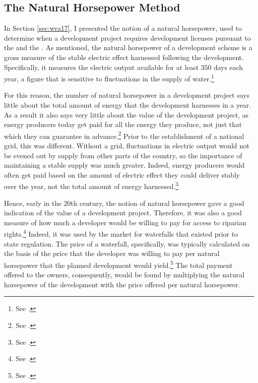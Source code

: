 \subsection{The Natural Horsepower Method}\label{sec:nathp}

In Section \ref{sec:wra17}, I presented the notion of a natural horsepower, used to determine when a development project requires development licenses pursuant to the \cite{wra17} and the \cite{ica17}. As mentioned, the natural horsepower of a development scheme is a gross measure of the stable electric effect harnessed following the development. Specifically, it measures the electric output available for at least 350 days each year, a figure that is sensitive to fluctuations in the supply of water.\footnote{See \cite{sofienlund07}.} 


For this reason, the number of natural horsepower in a development project says little about the total amount of energy that the development harnesses in a year. As a result it also says very little about the value of the development project, as energy producers today get paid for all the energy they produce, not just that which they can guarantee in advance.\footnote{See \cite[83-84]{uleberg08}.} Prior to the establishment of a national grid, this was different. Without a grid, fluctuations in electric output would not be evened out by supply from other parts of the country, so the importance of maintaining a stable supply was much greater. Indeed, energy producers would often get paid based on the amount of electric effect they could deliver stably over the year, not the total amount of energy harnessed.\footnote{See \cite[83]{uleberg08}.}

Hence, early in the 20th century, the notion of natural horsepower gave a good indication of the value of a development project. Therefore, it was also a good measure of how much a developer would be willing to pay for access to riparian rights.\footnote{See \cite[83]{uleberg08}.} Indeed, it was used by the market for waterfalls that existed prior to state regulation. The price of a waterfall, specifically, was typically calculated on the basis of the price that the developer was willing to pay per natural horsepower that the planned development would yield.\footnote{See \cite[83]{uleberg08}.} The total payment offered to the owners, consequently, would be found by multiplying the natural horsepower of the development with the price offered per natural horsepower.

